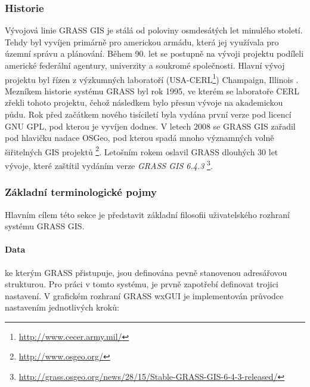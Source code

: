 \documentclass[a4paper,12pt,oneside]{report}
\begin{document}
\subsubsection*{Historie}
Vývojová linie GRASS GIS je stálá od poloviny osmdesátých let minulého
století. Tehdy byl vyvíjen primárně pro americkou armádu, která jej
využívala pro územní správu a plánování. Během 90. let se postupně na
vývoji projektu podíleli americké federální agentury, univerzity a
soukromé společnosti. Hlavní vývoj projektu byl řízen z výzkumných
laboratoří (USA-CERL\footnote{\url{http://www.cecer.army.mil/}})
Champaign, Illinois \cite{grasshist}.  Mezníkem historie systému GRASS byl
rok 1995, ve kterém se laboratoře CERL zřekli tohoto projektu, čehož
následkem bylo přesun vývoje na akademickou půdu. Rok před začátkem
nového tisíciletí byla vydána první verze pod licencí GNU GPL, pod
kterou je vyvíjen dodnes. V letech 2008 se GRASS GIS zařadil pod hlavičku nadace
   \acs{OSGeo}, pod kterou spadá mnoho významných volně šiřitelných
GIS
projektů \footnote{\url{http://www.osgeo.org/}}. Letošním rokem
oslavil GRASS dlouhých 30 let vývoje, které zaštítil vydáním verze
\textit{GRASS GIS 6.4.3} \footnote{\url{http://grass.osgeo.org/news/28/15/Stable-GRASS-GIS-6-4-3-released/}}.

\subsubsection*{Základní terminologické pojmy}
\label{subsubsec:grassterminologie}
Hlavním cílem této sekce je představit základní filosofii
uživatelského rozhraní systému GRASS GIS.
\paragraph*{Data} ke kterým GRASS přistupuje, jsou definována pevně
stanovenou adresářovou strukturou. Pro práci v tomto systému, je prvně
zapotřebí definovat trojici nastavení. V grafickém rozhraní GRASS
   \acs{wxGUI} je implementován průvodce nastavením jednotlivých kroků:
\end{document}
